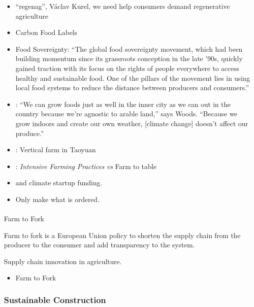 \documentclass[
  letterpaper,
  DIV=11,
  numbers=noendperiod]{scrartcl}
\makeatletter
\let\oldparagraph\paragraph
\renewcommand{\paragraph}{
    \@ifstar
      \xxxParagraphStar
      \xxxParagraphNoStar
  }
\newcommand{\xxxParagraphStar}[1]{\oldparagraph*{#1}\mbox{}}
\newcommand{\xxxParagraphNoStar}[1]{\oldparagraph{#1}\mbox{}}
\providecommand{\tightlist}{%
  \setlength{\itemsep}{0pt}\setlength{\parskip}{0pt}}\usepackage{longtable,booktabs,array}
\makeatother
\begin{document}
\begin{itemize}
\item
  ``regenag'', Václav Kurel, we need help consumers demand regenerative
  agriculture \citet{balticseaactiongroupEITFoodRegenerative2023}
\item
  \citet{kommendaWouldCarbonFood2022} Carbon Food Labels
\item
  Food Sovereignty: ``The global food sovereignty movement, which had
  been building momentum since its grassroots conception in the late
  '90s, quickly gained traction with its focus on the rights of people
  everywhere to access healthy and sustainable food. One of the pillars
  of the movement lies in using local food systems to reduce the
  distance between producers and consumers.''
\item
  \citet{caitlinstall-paquetFreshCityRise2021}: ``We can grow foods just
  as well in the inner city as we can out in the country because we're
  agnostic to arable land,'' says Woods. ``Because we grow indoors and
  create our own weather, {[}climate change{]} doesn't affect our
  produce.''
\item
  \citet{reneesalmonsenAsiaLargestVertical2018}: Vertical farm in
  Taoyuan
\item
  \citet{catherineshuSoutheastAsiaFarmtotable2023}: \emph{Intensive
  Farming Practices vs} Farm to table
\item
  \citet{akshatrathiChrisSaccaReturns2021} and
  \citet{lowercarboncapitalLowercarbonCapital2023} climate startup
  funding.
\item
  Only make what is ordered.
\end{itemize}

\paragraph{Farm to Fork}\label{farm-to-fork}

Farm to fork is a European Union policy to shorten the supply chain from
the producer to the consumer and add transparency to the system.

Supply chain innovation in agriculture.

\begin{itemize}
\tightlist
\item
  Farm to Fork \citet{financialtimesSustainabilityIdeasThat2022}
\end{itemize}

\subsubsection{Sustainable Construction}\label{sustainable-construction}
\end{document}
